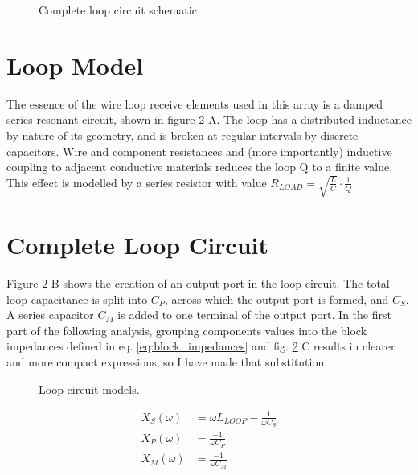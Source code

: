 \begin{figure}
    \centering
    
    \caption{Complete loop circuit schematic}
    \label{fig:loop_schematic}
\end{figure}

\section{Loop Model}
The essence of the wire loop receive elements used in this array is a damped series resonant circuit, shown in figure
\ref{fig:loop_model} A. The loop has a distributed inductance by nature of its geometry, and is broken at regular
intervals by discrete capacitors.  Wire and component resistances and (more importantly) inductive coupling to adjacent
conductive materials reduces the loop Q to a finite value. This effect is modelled by a series resistor with value
$R_{LOAD}=\sqrt{\frac{L}{C}}\cdot\frac{1}{Q}$

\section{Complete Loop Circuit}
Figure \ref{fig:loop_model} B shows the creation of an output port in the loop circuit. The total loop capacitance is
split into $C_P$, across which the output port is formed, and $C_S$. A series capacitor $C_M$ is added to one terminal
of the output port. In the first part of the following analysis, grouping components values into the block impedances
defined in eq. \ref{eq:block_impedances} and fig. \ref{fig:loop_model} C results in clearer and more compact
expressions, so I have made that substitution.

\begin{figure}
    \centering
    
    \caption{Loop circuit models.}
    \label{fig:loop_model}
\end{figure}

\begin{equation}\label{eq:block_impedances}
    \begin{aligned}
        X_S(\omega) &= \omega L_{LOOP} - \frac{1}{\omega C_S}\\
        X_P(\omega) &= \frac{-1}{\omega C_P}\\
        X_M(\omega) &= \frac{-1}{\omega C_M}\\
    \end{aligned}
\end{equation}

